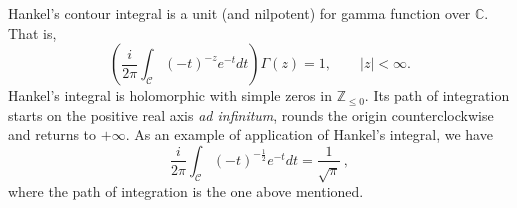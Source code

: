 \documentclass[12pt]{article}
\begin{document}
Hankel's contour integral is a unit (and nilpotent) for gamma function over $\mathbb{C}$. That is,
$$\left(\frac{i}{2\pi}\int_\mathcal{C}(-t)^{-z}e^{-t}dt\right)\Gamma(z)=1, \qquad |z|<\infty.$$
Hankel's integral is holomorphic with simple zeros in $\mathbb{Z}_{\leq 0}$. Its path of integration starts on the positive real axis \emph{ad infinitum}, rounds the origin counterclockwise and returns to $+\infty$. As an example of application of Hankel's integral, we have
$$\frac{i}{2\pi}\int_\mathcal{C}(-t)^{-\frac{1}{2}}e^{-t}dt=\frac{1}{\sqrt{\pi}}\,,$$
where the path of integration is the one above mentioned.

\end{document}
